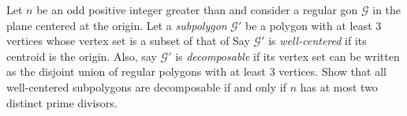 Let $n$ be an odd positive integer greater than  and consider a regular gon $\mathcal{G}$ in the plane centered at the origin. Let a \textit{subpolygon} $\mathcal{G}'$ be a polygon with at least $3$ vertices whose vertex set is a subset of that of  Say $\mathcal{G}'$ is \textit{well-centered} if its centroid is the origin. Also, say $\mathcal{G}'$ is \textit{decomposable} if its vertex set can be written as the disjoint union of regular polygons with at least $3$ vertices. Show that all well-centered subpolygons are decomposable if and only if $n$ has at most two distinct prime divisors.
